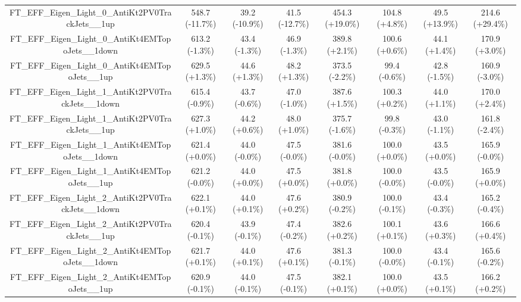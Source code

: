 \begin{table}[htbp!]
\begin{tiny}
\begin{center}
\begin{tabular}{c|c|c|c||c|c|c|c}
FT\_EFF\_Eigen\_Light\_0\_AntiKt2PV0TrackJets\_\_1up         & 548.7     (-11.7\%) & 39.2      (-10.9\%) & 41.5      (-12.7\%) & 454.3     (+19.0\%) & 104.8     (+4.8\%) & 49.5      (+13.9\%) & 214.6     (+29.4\%) \\ 
FT\_EFF\_Eigen\_Light\_0\_AntiKt4EMTopoJets\_\_1down         & 613.2     (-1.3\%) & 43.4      (-1.3\%) & 46.9      (-1.3\%) & 389.8     (+2.1\%) & 100.6     (+0.6\%) & 44.1      (+1.4\%) & 170.9     (+3.0\%) \\ 
FT\_EFF\_Eigen\_Light\_0\_AntiKt4EMTopoJets\_\_1up           & 629.5     (+1.3\%) & 44.6      (+1.3\%) & 48.2      (+1.3\%) & 373.5     (-2.2\%) & 99.4      (-0.6\%) & 42.8      (-1.5\%) & 160.9     (-3.0\%) \\ 
FT\_EFF\_Eigen\_Light\_1\_AntiKt2PV0TrackJets\_\_1down       & 615.4     (-0.9\%) & 43.7      (-0.6\%) & 47.0      (-1.0\%) & 387.6     (+1.5\%) & 100.3     (+0.2\%) & 44.0      (+1.1\%) & 170.0     (+2.4\%) \\ 
FT\_EFF\_Eigen\_Light\_1\_AntiKt2PV0TrackJets\_\_1up         & 627.3     (+1.0\%) & 44.2      (+0.6\%) & 48.0      (+1.0\%) & 375.7     (-1.6\%) & 99.8      (-0.3\%) & 43.0      (-1.1\%) & 161.8     (-2.4\%) \\ 
FT\_EFF\_Eigen\_Light\_1\_AntiKt4EMTopoJets\_\_1down         & 621.4     (+0.0\%) & 44.0      (-0.0\%) & 47.5      (-0.0\%) & 381.6     (-0.0\%) & 100.0     (+0.0\%) & 43.5      (+0.0\%) & 165.9     (-0.0\%) \\ 
FT\_EFF\_Eigen\_Light\_1\_AntiKt4EMTopoJets\_\_1up           & 621.2     (-0.0\%) & 44.0      (+0.0\%) & 47.5      (+0.0\%) & 381.8     (+0.0\%) & 100.0     (-0.0\%) & 43.5      (-0.0\%) & 165.9     (+0.0\%) \\ 
FT\_EFF\_Eigen\_Light\_2\_AntiKt2PV0TrackJets\_\_1down       & 622.1     (+0.1\%) & 44.0      (+0.1\%) & 47.6      (+0.2\%) & 380.9     (-0.2\%) & 100.0     (-0.1\%) & 43.4      (-0.3\%) & 165.2     (-0.4\%) \\ 
FT\_EFF\_Eigen\_Light\_2\_AntiKt2PV0TrackJets\_\_1up         & 620.4     (-0.1\%) & 43.9      (-0.1\%) & 47.4      (-0.2\%) & 382.6     (+0.2\%) & 100.1     (+0.1\%) & 43.6      (+0.3\%) & 166.6     (+0.4\%) \\ 
FT\_EFF\_Eigen\_Light\_2\_AntiKt4EMTopoJets\_\_1down         & 621.7     (+0.1\%) & 44.0      (+0.1\%) & 47.6      (+0.1\%) & 381.3     (-0.1\%) & 100.0     (-0.0\%) & 43.4      (-0.1\%) & 165.6     (-0.2\%) \\ 
FT\_EFF\_Eigen\_Light\_2\_AntiKt4EMTopoJets\_\_1up           & 620.9     (-0.1\%) & 44.0      (-0.1\%) & 47.5      (-0.1\%) & 382.1     (+0.1\%) & 100.0     (+0.0\%) & 43.5      (+0.1\%) & 166.2     (+0.2\%) \\ 

\end{tabular}
\end{center}
\end{tiny}
\end{table}
